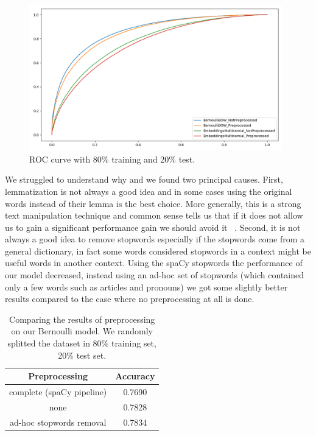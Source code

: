 \begin{figure}[h!t]
    \centering
    \includegraphics[width=11cm]{../experiments/plots/preprocessing.png}
    \caption{ROC curve with 80\% training and 20\% test.}
    \label{fig:PREPROCESSING_ROC}
\end{figure}


We struggled to understand why and we found two principal causes.
First, lemmatization is not always a good idea and in some cases using the original words instead of their lemma is the best choice.
More generally, this is a strong text manipulation technique and common sense tells us that if it does not allow us to gain a significant performance gain we should avoid it ~\cite{data:lemmatization_tips}. 
Second, it is not always a good idea to remove stopwords especially if the stopwords come from a general dictionary, in fact some words considered stopwords in a context might be useful words in another context. 
Using the spaCy stopwords the performance of our model decreased, instead using an ad-hoc set of stopwords (which contained only a few words such as articles and pronouns) we got some slightly better results compared to the case where no preprocessing at all is done.


\begin{table}[h!t]
    \centering
    \caption{Comparing the results of preprocessing on our Bernoulli model. We randomly splitted the dataset in 80\% training set, 20\% test set.}
    \label{tab:versus_metrics}
    \begin{tabular}{c|c}
        \hline
        Preprocessing & Accuracy \\
        \hline 
        complete (spaCy pipeline) & 0.7690 \\ 
        none & 0.7828 \\ 
        ad-hoc stopwords removal & 0.7834 \\ 
        \hline
    \end{tabular}
\end{table}
